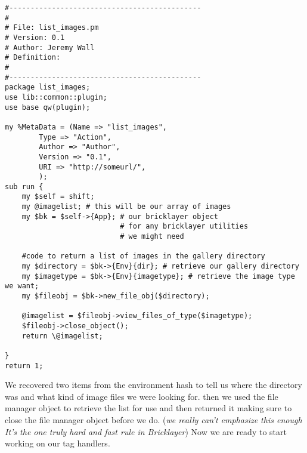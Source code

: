 \begin{verbatim}
#---------------------------------------------
# 
# File: list_images.pm
# Version: 0.1
# Author: Jeremy Wall
# Definition: 
#
#---------------------------------------------
package list_images;
use lib::common::plugin;
use base qw(plugin);

my %MetaData = (Name => "list_images",
		Type => "Action",
		Author => "Author",
		Version => "0.1",
		URI => "http://someurl/",
		);
sub run {
	my $self = shift;
	my @imagelist; # this will be our array of images
	my $bk = $self->{App}; # our bricklayer object 
	                       # for any bricklayer utilities 
	                       # we might need
	
	#code to return a list of images in the gallery directory
	my $directory = $bk->{Env}{dir}; # retrieve our gallery directory
	my $imagetype = $bk->{Env}{imagetype}; # retrieve the image type we want;
	my $fileobj = $bk->new_file_obj($directory);
	
	@imagelist = $fileobj->view_files_of_type($imagetype);
	$fileobj->close_object();
	return \@imagelist;
	
}
return 1;
\end{verbatim}
We recovered two items from the environment hash to tell us where the directory was and what kind of image files we were looking for. then we used the file manager object to retrieve the list for use and then returned it making sure to close the file manager object before we do. (\emph{we really can't emphasize this enough It's the one truly hard and fast rule in Bricklayer}) Now we are ready to start working on our tag handlers.
